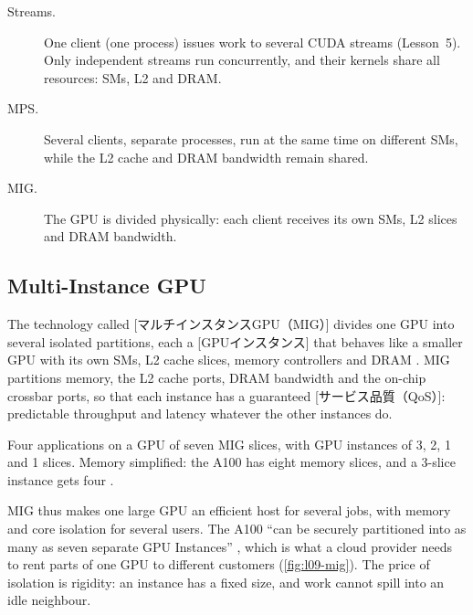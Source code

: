 \documentclass[../main.tex]{subfiles}
\begin{document}
\begin{description}
  \item[Streams.]  One client (one process) issues work to several CUDA
    streams (Lesson~5).  Only independent streams run concurrently, and
    their kernels share all resources: SMs, L2 and DRAM.
  \item[MPS.]  Several clients, separate processes, run at the same time
    on different SMs, while the L2 cache and DRAM bandwidth remain
    shared.
  \item[MIG.]  The GPU is divided physically: each client receives its
    own SMs, L2 slices and DRAM bandwidth.
\end{description}

\subsection{Multi-Instance GPU}

\begin{definition}
  The technology called
  [マルチインスタンスGPU（MIG）] divides one
  GPU into several isolated partitions, each a
  [GPUインスタンス] that behaves like a smaller GPU
  with its own SMs, L2 cache slices, memory controllers and DRAM
  \cite{nvidia2020ampere}.  MIG partitions memory, the L2 cache ports,
  DRAM bandwidth and the on-chip crossbar ports, so that each instance
  has a guaranteed
  [サービス品質（QoS）]: predictable
  throughput and latency whatever the other instances do.
\end{definition}

\begin{marginfigure}
  \centering
  
  \caption{Four applications on a GPU of seven MIG slices, with GPU
    instances of 3, 2, 1 and 1 slices.  Memory simplified: the A100 has
    eight memory slices, and a 3-slice instance gets four
    \cite[§6.2]{nvidia2026mig}.}
  \label{fig:l09-mig}
\end{marginfigure}

MIG thus makes one large GPU an efficient host for several jobs, with
memory and core isolation for several users.  The A100 \enquote{can be
securely partitioned into as many as seven separate GPU Instances}
\cite{nvidia2020ampere}, which is what a cloud provider needs to rent
parts of one GPU to different customers (\cref{fig:l09-mig}).  The
price of isolation is rigidity: an instance has a fixed size, and work
cannot spill into an idle neighbour.
\end{document}
